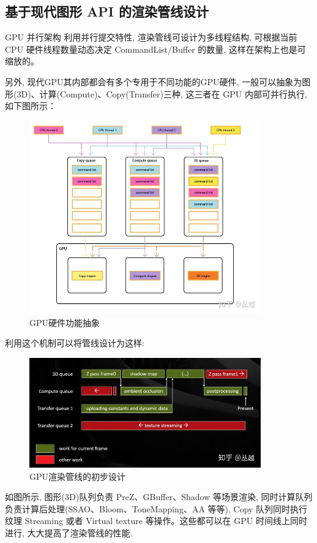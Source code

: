 \documentclass[UTF8]{ctexart}
\begin{document}
\subsection{基于现代图形 API 的渲染管线设计}
GPU 并行架构
利用并行提交特性, 渲染管线可设计为多线程结构, 可根据当前 CPU 硬件线程数量动态决定 CommandList/Buffer 的数量, 这样在架构上也是可缩放的。

另外, 现代GPU其内部都会有多个专用于不同功能的GPU硬件, 一般可以抽象为图形(3D)、计算(Compute)、Copy(Transfer)三种, 这三者在 GPU 内部可并行执行, 如下图所示：

\begin{figure}[H]
  \includegraphics[width=10cm]{rendering_framework.jpg}
  \centering
  \caption{GPU硬件功能抽象}
  \label{fig:gpu_hardware_abstraction}
\end{figure}

利用这个机制可以将管线设计为这样:
\begin{figure}[H]
  \includegraphics[width=10cm]{rendering_pipeline_design.jpg}
  \centering
  \caption{GPU渲染管线的初步设计}
  \label{fig:gpu_rendering_pipeline_design_0}
\end{figure}

如图所示, 图形(3D)队列负责 PreZ、GBuffer、Shadow 等场景渲染, 同时计算队列负责计算后处理(SSAO、Bloom、ToneMapping、AA 等等), Copy 队列同时执行纹理 Streaming 或者 Virtual texture 等操作。这些都可以在 GPU 时间线上同时进行, 大大提高了渲染管线的性能.
\end{document}
